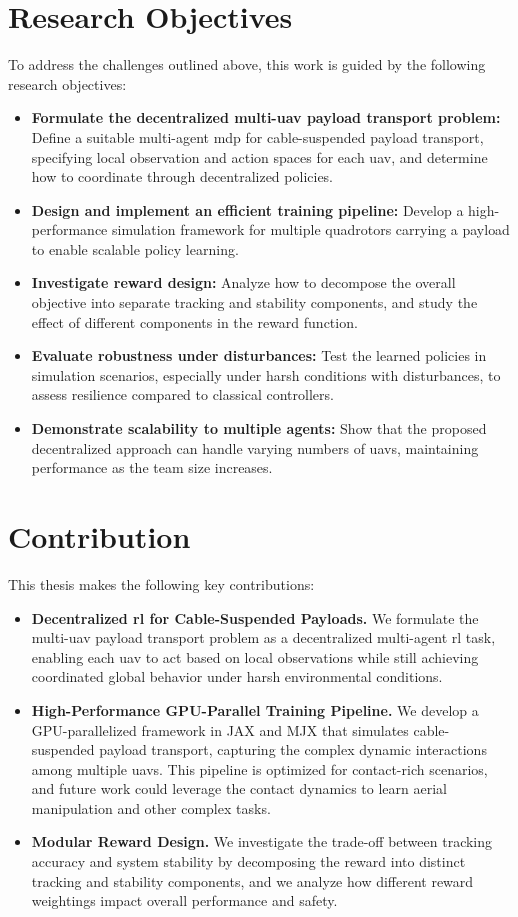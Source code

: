 \section{Research Objectives}
To address the challenges outlined above, this work is guided by the following research objectives:
\begin{itemize}
    \item \textbf{Formulate the decentralized multi-\gls{uav} payload transport problem:} Define a suitable multi-agent \gls{mdp} for cable-suspended payload transport, specifying local observation and action spaces for each \gls{uav}, and determine how to coordinate through decentralized policies.
    \item \textbf{Design and implement an efficient training pipeline:} Develop a high-performance simulation framework for multiple quadrotors carrying a payload to enable scalable policy learning.
    \item \textbf{Investigate reward design:} Analyze how to decompose the overall objective into separate tracking and stability components, and study the effect of different components in the reward function.
    \item \textbf{Evaluate robustness under disturbances:} Test the learned policies in simulation scenarios, especially under harsh conditions with disturbances, to assess resilience compared to classical controllers.
    \item \textbf{Demonstrate scalability to multiple agents:} Show that the proposed decentralized approach can handle varying numbers of \glspl{uav}, maintaining performance as the team size increases.
\end{itemize}
\section{Contribution}
This thesis makes the following key contributions:
\begin{itemize}
    \item \textbf{Decentralized \gls{rl} for Cable-Suspended Payloads.} We formulate the multi-\gls{uav} payload transport problem as a decentralized multi-agent \gls{rl} task, enabling each \gls{uav} to act based on local observations while still achieving coordinated global behavior under harsh environmental conditions.
    \item \textbf{High-Performance GPU-Parallel Training Pipeline.} We develop a GPU-parallelized framework in JAX and MJX that simulates cable-suspended payload transport, capturing the complex dynamic interactions among multiple \glspl{uav}. This pipeline is optimized for contact-rich scenarios, and future work could leverage the contact dynamics to learn aerial manipulation and other complex tasks.
    \item \textbf{Modular Reward Design.} We investigate the trade-off between tracking accuracy and system stability by decomposing the reward into distinct tracking and stability components, and we analyze how different reward weightings impact overall performance and safety.
\end{itemize}

